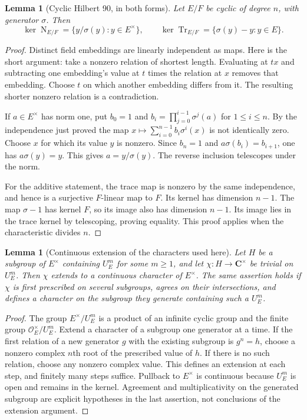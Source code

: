 \documentclass[11pt]{amsart}
\newtheorem{lemma}[theorem]{Lemma}
\theoremstyle{definition}
\theoremstyle{remark}
\newcommand{\Tr}{\operatorname{Tr}}
\newcommand{\Nm}{\operatorname{N}}
\newcommand{\OO}{\mathcal O}\newcommand{\pp}{\mathfrak p}\newcommand{\PP}{\mathfrak P}
\newcommand{\CC}{\mathbf C}\newcommand{\TT}{\mathcal T}\newcommand{\ind}{\mathbf1}
\begin{document}
\begin{lemma}[Cyclic Hilbert 90, in both forms]\label{C:hilbert90}
Let $E/F$ be cyclic of degree $n$, with generator $\sigma$.
Then
\[
 \ker\Nm_{E/F}=\{y/\sigma(y):y\in E^\times\},\qquad
 \ker\Tr_{E/F}=\{\sigma(y)-y:y\in E\}.
\]
\end{lemma}
\begin{proof}
Distinct field embeddings are linearly independent as maps. Here is the
short argument: take a nonzero relation of shortest length. Evaluating
at $tx$ and subtracting one embedding's value at $t$ times the relation
at $x$ removes that embedding. Choose $t$ on which another embedding
differs from it. The resulting shorter nonzero relation is a
contradiction.

If $a\in E^\times$ has norm one, put $b_0=1$ and
$b_i=\prod_{j=0}^{i-1}\sigma^j(a)$ for $1\le i\le n$.
By the independence just proved the map
$x\mapsto\sum_{i=0}^{n-1}b_i\sigma^i(x)$ is not identically zero.
Choose $x$ for which its value $y$ is nonzero. Since $b_n=1$ and
$a\sigma(b_i)=b_{i+1}$, one has $a\sigma(y)=y$.
This gives $a=y/\sigma(y)$. The reverse inclusion telescopes under
the norm.

For the additive statement, the trace map is nonzero by the same
independence, and hence is a surjective $F$-linear map to $F$.
Its kernel has dimension $n-1$. The map $\sigma-1$ has kernel $F$,
so its image also has dimension $n-1$. Its image lies in the trace
kernel by telescoping, proving equality. This proof applies when
the characteristic divides $n$.
\end{proof}

\begin{lemma}[Continuous extension of the characters used here]
\label{C:character-extension}
Let $H$ be a subgroup of $E^\times$ containing $U_E^m$ for some
$m\ge1$, and let $\chi:H\to\CC^\times$ be trivial on $U_E^m$.
Then $\chi$ extends to a continuous character of $E^\times$.
The same assertion holds if $\chi$ is first prescribed on several
subgroups, agrees on their intersections, and defines a character on
the subgroup they generate containing such a $U_E^m$.
\end{lemma}
\begin{proof}
The group $E^\times/U_E^m$ is a product of an infinite cyclic group
and the finite group $\OO_E^\times/U_E^m$. Extend a character of a
subgroup one generator at a time. If the first relation of a new
generator $g$ with the existing subgroup is $g^n=h$, choose a nonzero
complex $n$th root of the prescribed value of $h$. If there is no
such relation, choose any nonzero complex value. This defines an
extension at each step, and finitely many steps suffice. Pullback to
$E^\times$ is continuous because $U_E^m$ is open and remains in the
kernel. Agreement and multiplicativity on the generated subgroup are
explicit hypotheses in the last assertion, not conclusions of the
extension argument.
\end{proof}
\end{document}
